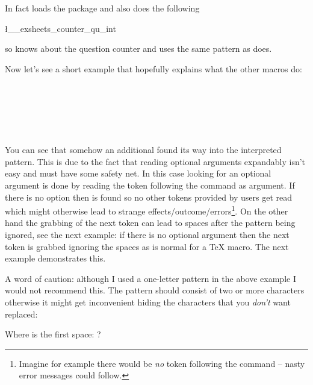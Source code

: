 \documentclass[load-preamble+]{cnltx-doc}
\begin{document}
In fact  loads the  package and also does the
following
\begin{sourcecode}
  \l__exsheets_counter_qu_int
\end{sourcecode}
so  knows about the question counter and uses the same pattern as
 does.

Now let's see a short example that hopefully explains what the other macros
do:
\begin{example}
  \setcounter{test}{11}
   \\
  \ttfamily\makeatletter
  \meaning\@cntfmts@parsed@pattern
  
  \bigskip
  \SaveCounterPattern\tmpa{}
  \meaning\tmpa \\
  \meaning\tmpb
  
  \bigskip
  \eSaveCounterPattern\tmpa{}
  \meaning\tmpa \\
  \meaning\tmpb
\end{example}
You can see that somehow an additional  found its way into the
interpreted pattern. This is due to the fact that reading optional arguments
expandably isn't easy and must have some safety net.  In this case looking for
an optional argument is done by reading the token following the command as
argument.  If there is no option then  is found so no other tokens
provided by users get read which might otherwise lead to strange
effects/outcome/errors\footnote{Imagine for example there would be \emph{no}
  token following the command -- nasty error messages could follow.}.  On the
other hand the grabbing of the next token can lead to spaces after the pattern
being ignored, see the next example: if there is no optional argument then the
next token is grabbed ignoring the spaces as is normal for a \TeX{} macro.
The next example demonstrates this.

A word of caution: although I used a one-letter pattern in the above example I
would not recommend this.  The pattern should consist of two or more
characters otherwise it might get inconvenient hiding the characters that you
\emph{don't} want replaced:
\begin{example}
  \setcounter{test}{3}
  Where is the first space: ?\par
\end{example}
\end{document}
